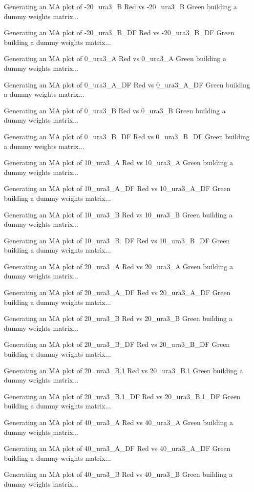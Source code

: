 \documentclass[titlepage]{article}
\begin{document}
\begin{Schunk}
\begin{Soutput}
Generating an MA plot of  -20_ura3_B Red vs -20_ura3_B Green 
building a dummy weights matrix... 

Generating an MA plot of  -20_ura3_B_DF Red vs -20_ura3_B_DF Green 
building a dummy weights matrix... 

Generating an MA plot of  0_ura3_A Red vs 0_ura3_A Green 
building a dummy weights matrix... 

Generating an MA plot of  0_ura3_A_DF Red vs 0_ura3_A_DF Green 
building a dummy weights matrix... 

Generating an MA plot of  0_ura3_B Red vs 0_ura3_B Green 
building a dummy weights matrix... 

Generating an MA plot of  0_ura3_B_DF Red vs 0_ura3_B_DF Green 
building a dummy weights matrix... 

Generating an MA plot of  10_ura3_A Red vs 10_ura3_A Green 
building a dummy weights matrix... 

Generating an MA plot of  10_ura3_A_DF Red vs 10_ura3_A_DF Green 
building a dummy weights matrix... 

Generating an MA plot of  10_ura3_B Red vs 10_ura3_B Green 
building a dummy weights matrix... 

Generating an MA plot of  10_ura3_B_DF Red vs 10_ura3_B_DF Green 
building a dummy weights matrix... 

Generating an MA plot of  20_ura3_A Red vs 20_ura3_A Green 
building a dummy weights matrix... 

Generating an MA plot of  20_ura3_A_DF Red vs 20_ura3_A_DF Green 
building a dummy weights matrix... 

Generating an MA plot of  20_ura3_B Red vs 20_ura3_B Green 
building a dummy weights matrix... 

Generating an MA plot of  20_ura3_B_DF Red vs 20_ura3_B_DF Green 
building a dummy weights matrix... 

Generating an MA plot of  20_ura3_B.1 Red vs 20_ura3_B.1 Green 
building a dummy weights matrix... 

Generating an MA plot of  20_ura3_B.1_DF Red vs 20_ura3_B.1_DF Green 
building a dummy weights matrix... 

Generating an MA plot of  40_ura3_A Red vs 40_ura3_A Green 
building a dummy weights matrix... 

Generating an MA plot of  40_ura3_A_DF Red vs 40_ura3_A_DF Green 
building a dummy weights matrix... 

Generating an MA plot of  40_ura3_B Red vs 40_ura3_B Green 
building a dummy weights matrix... 


\end{Soutput}
\end{Schunk}
\end{document}
